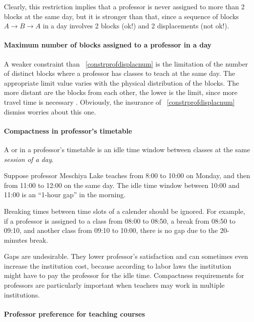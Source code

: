 Clearly, this restriction implies that a professor is never assigned to more than 2 blocks at the same day, but it is stronger than that, since a sequence of blocks $A \rightarrow B \rightarrow A$ in a day involves 2 blocks (ok!) and 2 displacements (not ok!).


\paragraph{Maximum number of blocks assigned to a professor in a day}
\label{constrmaxblockprof}

A weaker constraint than ~\ref{constrprofdisplacnum} is the limitation of the number of distinct blocks where a professor has classes to teach at the same day. The appropriate limit value varies with the physical distribution of the blocks. The more distant are the blocks from each other, the lower is the limit, since more travel time is necessary . Obviously, the insurance of ~\ref{constrprofdisplacnum} dismiss worries about this one.


\paragraph{Compactness in professor's timetable}
\label{constrmingapprof}

A  or  in a professor's timetable is an idle time window between classes at the same \textit{session of a day}.

Suppose professor Meschiya Lake teaches from 8:00 to 10:00 on Monday, and then from 11:00 to 12:00 on the same day. The idle time window between 10:00 and 11:00 is an ``1-hour gap'' in the morning.

Breaking times between time slots of a calender should be ignored. For example, if a professor is assigned to a class from 08:00 to 08:50, a break from 08:50 to 09:10, and another class from 09:10 to 10:00, there is no gap due to the 20-minutes break.

Gaps are undesirable. They lower professor's satisfaction and can sometimes even increase the institution cost, because according to labor laws the institution might have to pay the professor for the idle time. Compactness requirements for professors are particularly important when teachers may work in multiple institutions.



\paragraph{Professor preference for teaching courses}
\label{constrprefercourse}

